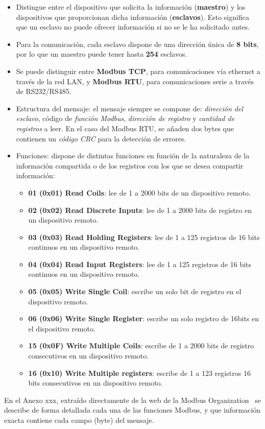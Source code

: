\begin{itemize}
  \item Distingue entre el dispositivo que solicita la información (\textbf{maestro}) y los dispositivos que proporcionan dicha información (\textbf{esclavos}). Esto significa que un esclavo no puede ofrecer información si no se le ha solicitado antes.  
  \item Para la comunicación, cada esclavo dispone de una dirección única de \textbf{8 bits}, por lo que un maestro puede tener hasta \textbf{254} esclavos.
  \item Se puede distinguir entre \textbf{Modbus TCP}, para comunicaciones vía ethernet a través de la red LAN, y \textbf{Modbus RTU}, para comunicaciones serie a través de RS232/RS485.
  \item Estructura del mensaje: el mensaje siempre se compone de: \textit{dirección del esclavo}, código de \textit{función Modbus}, \textit{dirección de registro} y \textit{cantidad de registros} a leer. En el caso del Modbus RTU, se añaden dos bytes que contienen un \textit{código CRC} para la detección de errores.
  \item Funciones: dispone de distintas funciones en función de la naturaleza de la información compartida o de los registros con los que se desea compartir información:
  \begin{itemize}
    \item \textbf{01 (0x01) Read Coils}: lee de 1 a 2000 bits de un dispositivo remoto.
    \item \textbf{02 (0x02) Read Discrete Inputs}: lee de 1 a 2000 bits de registro en un dispositivo remoto.
    \item \textbf{03 (0x03) Read Holding Registers}: lee de 1 a 125 registros de 16 bits continuos en un dispositivo remoto.
    \item \textbf{04 (0x04) Read Input Registers}: lee de 1 a 125 registros de 16 bits continuos en un dispositivo remoto.
    \item \textbf{05 (0x05) Write Single Coil}: escribe un solo bit de registro en el dispositivo remoto.
    \item \textbf{06 (0x06) Write Single Register}: escribe un solo registro de 16bits en el dispositivo remoto.
    \item \textbf{15 (0x0F) Write Multiple Coils}: escribe de 1 a 2000 bits de registro consecutivos en un dispositivo remoto.
    \item \textbf{16 (0x10) Write Multiple registers}: escribe de 1 a 123 registros 16 bits consecutivos en un dispositivo remoto.
  \end{itemize}  
\end{itemize} 

En el Anexo xxx, extraído directamente de la web de la Modbus Organization~\cite{modbusorg} se describe de forma detallada cada una de las funciones Modbus, y que información exacta contiene cada campo (byte) del mensaje.


